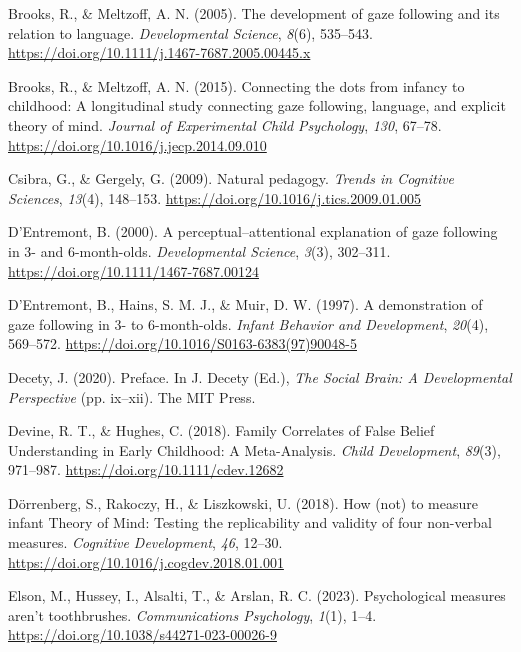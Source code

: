 \documentclass[
]{scrbook}
\newlength{\cslhangindent}
\newenvironment{CSLReferences}[2] %
 {\begin{list}{}{%
  \setlength{\itemindent}{0pt}
  \setlength{\leftmargin}{0pt}
  \setlength{\parsep}{0pt}
  \ifodd #1
   \setlength{\leftmargin}{\cslhangindent}
   \setlength{\itemindent}{-1\cslhangindent}
  \fi
  \setlength{\itemsep}{#2\baselineskip}}}
 {\end{list}}
\begin{document}
\begin{CSLReferences}{1}{0}
Brooks, R., \& Meltzoff, A. N. (2005). The development of gaze following and its relation to language. \emph{Developmental Science}, \emph{8}(6), 535--543. \url{https://doi.org/10.1111/j.1467-7687.2005.00445.x}

Brooks, R., \& Meltzoff, A. N. (2015). Connecting the dots from infancy to childhood: {A} longitudinal study connecting gaze following, language, and explicit theory of mind. \emph{Journal of Experimental Child Psychology}, \emph{130}, 67--78. \url{https://doi.org/10.1016/j.jecp.2014.09.010}

Csibra, G., \& Gergely, G. (2009). Natural pedagogy. \emph{Trends in Cognitive Sciences}, \emph{13}(4), 148--153. \url{https://doi.org/10.1016/j.tics.2009.01.005}

D'Entremont, B. (2000). A perceptual--attentional explanation of gaze following in 3- and 6-month-olds. \emph{Developmental Science}, \emph{3}(3), 302--311. \url{https://doi.org/10.1111/1467-7687.00124}

D'Entremont, B., Hains, S. M. J., \& Muir, D. W. (1997). A demonstration of gaze following in 3- to 6-month-olds. \emph{Infant Behavior and Development}, \emph{20}(4), 569--572. \url{https://doi.org/10.1016/S0163-6383(97)90048-5}

Decety, J. (2020). Preface. In J. Decety (Ed.), \emph{The {Social Brain}: {A Developmental Perspective}} (pp. ix--xii). The MIT Press.

Devine, R. T., \& Hughes, C. (2018). Family {Correlates} of {False Belief Understanding} in {Early Childhood}: {A Meta-Analysis}. \emph{Child Development}, \emph{89}(3), 971--987. \url{https://doi.org/10.1111/cdev.12682}

Dörrenberg, S., Rakoczy, H., \& Liszkowski, U. (2018). How (not) to measure infant {Theory} of {Mind}: {Testing} the replicability and validity of four non-verbal measures. \emph{Cognitive Development}, \emph{46}, 12--30. \url{https://doi.org/10.1016/j.cogdev.2018.01.001}

Elson, M., Hussey, I., Alsalti, T., \& Arslan, R. C. (2023). Psychological measures aren't toothbrushes. \emph{Communications Psychology}, \emph{1}(1), 1--4. \url{https://doi.org/10.1038/s44271-023-00026-9}


\end{CSLReferences}
\end{document}

